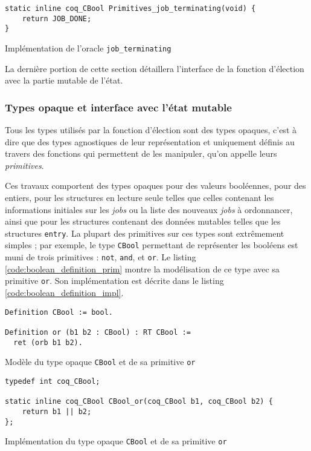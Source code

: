 	\begin{listing}[!ht]
	\begin{verbatim}
static inline coq_CBool Primitives_job_terminating(void) {
    return JOB_DONE;
}
	\end{verbatim}
	\caption{Implémentation de l'oracle \texttt{job\_terminating}}
	\label{code:job_terminating_impl}
	\end{listing}

	La dernière portion de cette section détaillera l'interface de la fonction d'élection avec la partie mutable de l'état.

	\subsubsection{Types opaque et interface avec l'état mutable}

	Tous les types utilisés par la fonction d'élection sont des types opaques, c'est à dire que des types agnostiques de leur représentation et uniquement définis au travers des fonctions qui permettent de les manipuler, qu'on appelle leurs \emph{primitives}.

	Ces travaux comportent des types opaques pour des valeurs booléennes, pour des entiers, pour les structures en lecture seule telles que celles contenant les informations initiales sur les \emph{jobs} ou la liste des nouveaux \emph{jobs} à ordonnancer, ainsi que pour les structures contenant des données mutables telles que les structures \texttt{entry}. La plupart des primitives sur ces types sont extrêmement simples ; par exemple, le type \texttt{CBool} permettant de représenter les booléens est muni de trois primitives : \texttt{not}, \texttt{and}, et \texttt{or}. Le listing \ref{code:boolean_definition_prim} montre la modélisation de ce type avec sa primitive \texttt{or}. Son implémentation est décrite dans le listing \ref{code:boolean_definition_impl}.

	\begin{listing}[!ht]
	\begin{verbatim}
Definition CBool := bool.

Definition or (b1 b2 : CBool) : RT CBool :=
  ret (orb b1 b2).
	\end{verbatim}
	\caption{Modèle du type opaque \texttt{CBool} et de sa primitive \texttt{or}}
	\label{code:boolean_definition_prim}
	\end{listing}

	\begin{listing}[!ht]
	\begin{verbatim}
typedef int coq_CBool;

static inline coq_CBool CBool_or(coq_CBool b1, coq_CBool b2) {
    return b1 || b2;
};
	\end{verbatim}
	\caption{Implémentation du type opaque \texttt{CBool} et de sa primitive \texttt{or}}
	\label{code:boolean_definition_impl}
	\end{listing}

